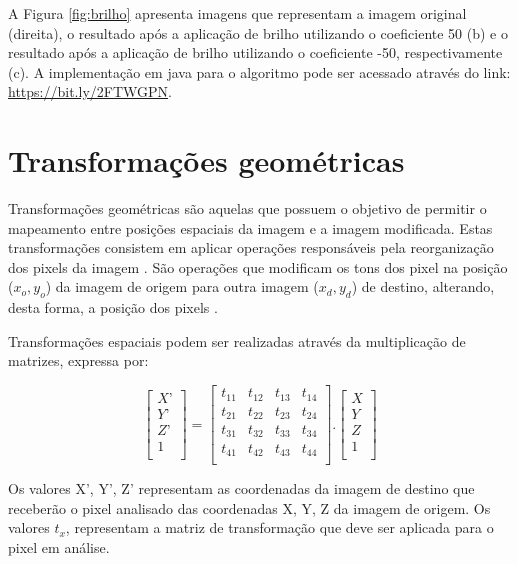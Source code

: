 \documentclass[
	12pt,				%
	oneside,			%
	a4paper,			%
	english,			%
	french,				%
	spanish,			%
	brazil,				%
	]{abntex2}
\begin{document}
A Figura \ref{fig:brilho} apresenta imagens que representam a imagem original (direita), o resultado após a aplicação de brilho utilizando o coeficiente 50 (b) e o resultado após a aplicação de brilho utilizando o coeficiente -50, respectivamente (c). A implementação em java para o algoritmo pode ser acessado através do link: \url{https://bit.ly/2FTWGPN}.

\section{Transformações geométricas}

Transformações geométricas são aquelas que possuem o objetivo de permitir o mapeamento entre posições espaciais da imagem e a imagem modificada. Estas transformações consistem em aplicar operações responsáveis pela reorganização dos pixels da imagem \cite{pedriniSchwartz:2008}. São operações que modificam os tons dos pixel na posição (\(x_o, y_o\)) da imagem de origem para outra imagem (\(x_d, y_d\)) de destino, alterando, desta forma, a posição dos pixels \cite{conciAzevedoLeta:2008}.

Transformações espaciais podem ser realizadas através da multiplicação de matrizes, expressa por:

\[
\begin{bmatrix}
    X’       \\ 
	Y’       \\ 
	Z’       \\ 
    1        \\ 
\end{bmatrix}
=
\begin{bmatrix}
    t_{11} & t_{12} & t_{13} & t_{14}   \\ 
	t_{21} & t_{22} & t_{23} & t_{24}   \\ 
	t_{31} & t_{32} & t_{33} & t_{34}   \\ 
	t_{41} & t_{42} & t_{43} & t_{44}   \\ 
\end{bmatrix}
.
\begin{bmatrix}
    X       \\ 
	Y       \\ 
	Z       \\ 
    1       \\ 
\end{bmatrix}
\]

Os valores X’, Y’, Z' representam as coordenadas da imagem de destino que receberão o pixel analisado das coordenadas X, Y, Z da imagem de origem. Os valores \(t_x\), representam a matriz de transformação que deve ser aplicada para o pixel em análise.
\end{document}
